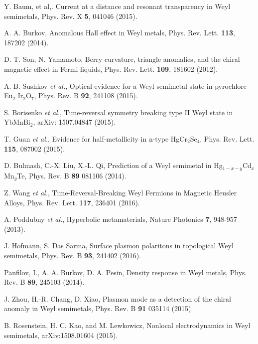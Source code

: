 \documentclass[aps,twocolumn,prl,groupedaddress]{revtex4}
\begin{document}
\begin{thebibliography}{99}
 Y. Baum, et al,. Current at a distance and resonant transparency in Weyl semimetals, Phys. Rev. X {\bf 5}, 041046 (2015).

 A. A. Burkov, Anomalous Hall effect in Weyl metals, Phys. Rev. Lett. {\bf 113}, 187202 (2014).




 D. T. Son, N. Yamamoto, Berry curvature, triangle anomalies, and the chiral magnetic effect in Fermi liquids, Phys. Rev. Lett. {\bf 109}, 181602 (2012).


 A. B. Sushkov {\it et al.}, Optical evidence for a Weyl semimetal state in pyrochlore Eu$_2$ Ir$_2$O$_7$, Phys. Rev. B {\bf 92}, 241108 (2015).

 S. Borisenko {\it et al.}, Time-reversal symmetry breaking type II Weyl state in YbMnBi$_2$, arXiv: 1507.04847 (2015). 

 T. Guan {\it et al.}, Evidence for half-metallicity in n-type HgCr$_2$Se$_4$, Phys. Rev. Lett. {\bf 115}, 087002 (2015).

 D. Bulmash, C.-X. Liu, X.-L. Qi, Prediction of a Weyl semimetal in Hg$_{1-x-y}$Cd$_x$Mn$_y$Te, Phys. Rev. B {\bf 89} 081106 (2014).

 Z. Wang {\it et al.}, Time-Reversal-Breaking Weyl Fermions in Magnetic Heusler Alloys, Phys. Rev. Lett. 1{\bf 17}, 236401 (2016).

 A. Poddubny {\it et al.}, Hyperbolic metamaterials, Nature Photonics {\bf 7}, 948-957 (2013).

 J. Hofmann, S. Das Sarma, Surface plasmon polaritons in topological Weyl semimetals, Phys. Rev. B {\bf 93}, 241402 (2016).

 Panfilov, I., A. A. Burkov, D. A. Pesin, Density response in Weyl metals, Phys. Rev. B {\bf 89}, 245103 (2014). 

 J. Zhou, H.-R. Chang, D. Xiao, Plasmon mode as a detection of the chiral anomaly in Weyl semimetals, Phys. Rev. B {\bf 91} 035114 (2015). 

 B. Rosenstein, H. C. Kao, and M. Lewkowicz, Nonlocal electrodynamics in Weyl semimetals, arXiv:1508.01604 (2015).


\end{thebibliography}
\end{document}
